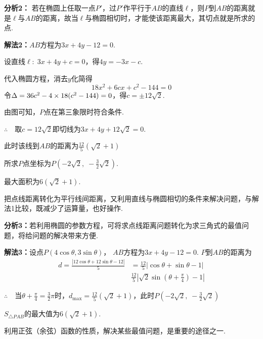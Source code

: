 \begin{analyze}
\textbf{分析2：}     若在椭圆上任取一点$P'$，过$P'$作平行于$AB$的直线$\ell$，则$P$到$AB$的距离就是$\ell$与$AB$的距离，故当$\ell$与椭圆相切时，才能使该距离最大，其切点就是所求的点.
\end{analyze}

\begin{solution}
\textbf{解法2：}$AB$方程为$3x+4y-12=0$.

设直线$\ell:\; 3x+4y+c=0$，得$4y=-3x-c$.

代入椭圆方程，消去$y$化简得
\[18x^2+6cx+c^2-144=0\]
令$\Delta =36c^2-4\times18(c^2-144)=0$，得$c=\pm 12\sqrt{2}$.

由图可知，$P$点在第三象限时符合条件.

$\therefore\quad $取$c=12\sqrt{2}$即切线为$3x+4y+12\sqrt{2}=0$.

此时该线到$AB$的距离为$\frac{12}{5}(\sqrt{2}+1)$

所求$P$点坐标为$P\left(-2\sqrt{2},\; -\frac{3}{2}\sqrt{2}\right)$.

最大面积为$6(\sqrt{2}+1)$.
\end{solution}

\begin{remark}
  把点线距离转化为平行线间距离，又利用直线与椭圆相切的条件来解决问题，与解法1比较，既减少了运算量，也好操作.
\end{remark}


\begin{analyze}
   \textbf{分析3：}若利用椭圆的参数方程，可将求点线距离问题转化为求三角式的最值问题，将给问题的解决带来方便.
\end{analyze}

\begin{solution}
\textbf{解法3：}设点$P(4\cos\theta, 3\sin\theta)$，
$AB$方程为$3x+4y-12=0$. 
$P$到$AB$的距离为
\[\begin{split}
  d=\frac{|12\cos\theta+12\sin\theta-12|}{5}&=\frac{12}{5}|\cos\theta+\sin\theta-1|\\
  &\frac{12}{5}\left|\sqrt{2}\sin\left(\theta+\frac{\pi}{4}\right)-1\right|  
\end{split}\]

$\therefore\quad $当$\theta+\frac{\pi}{4}=\frac{3}{2}\pi$时，$d_{\max}=\frac{12}{5}\left(\sqrt{2}+1\right)$，此时$P\left(-2\sqrt{2},\; -\frac{3}{2}\sqrt{2}\right)$

$S_{\triangle PAB}$的最大值为$6(\sqrt{2}+1)$.
\end{solution}

\begin{remark}
利用正弦（余弦）函数的性质，解决某些最值问题，是重要的途径之一.
\end{remark}

